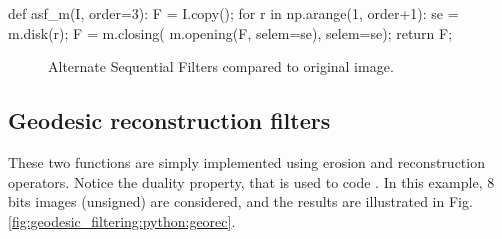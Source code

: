 \begin{python}
def asf_m(I, order=3):
    F = I.copy();
    for r in np.arange(1, order+1):
        se = m.disk(r);
        F = m.closing( m.opening(F, selem=se), selem=se);
    return F;
\end{python}

\begin{figure}[H]
 \centering\caption{Alternate Sequential Filters compared to original image.}%
 \hfill
 \hfill
 \label{fig:geodesic_filtering:python:asf}%
\end{figure}

\subsection{Geodesic reconstruction filters}
These two functions are simply implemented using erosion and reconstruction operators. Notice the duality property, that is used to code . In this example, 8 bits images (unsigned) are considered, and the results are illustrated in Fig.\ref{fig:geodesic_filtering:python:georec}.

